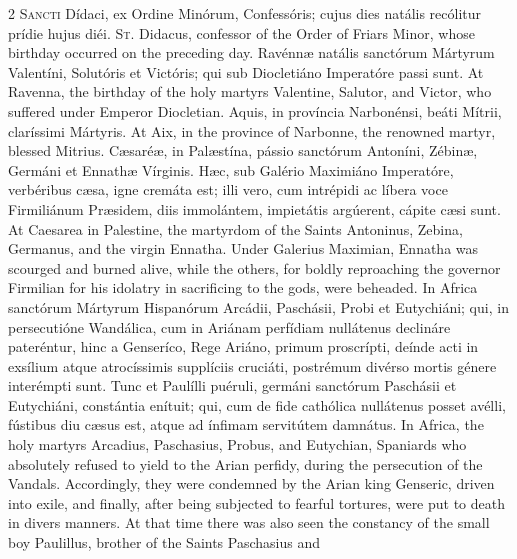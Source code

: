 \begin{paracol}{2}
\lettrine[lines=2]{S}{ancti} Dídaci, ex 
 Ordine Minórum, Confessóris; cujus dies natális recólitur prídie hujus diéi.
\switchcolumn
{}
\lettrine[lines=2]{S}{t.} Didacus, confessor of the Order 
 of Friars Minor, whose birthday occurred on the preceding day.
\switchcolumn*
{}
Ravénnæ natális 
 sanctórum Mártyrum Valentíni, Solutóris et Victóris; qui sub Diocletiáno 
 Imperatóre passi sunt.
\switchcolumn
{}
At Ravenna, the birthday of the holy 
 martyrs Valentine, Salutor, and Victor, who suffered under Emperor 
 Diocletian.
\switchcolumn*
{}
Aquis, in província 
 Narbonénsi, beáti Mítrii, claríssimi Mártyris.
\switchcolumn
{}
At Aix, in the province of Narbonne, 
 the renowned martyr, blessed Mitrius.
\switchcolumn*
{}
Cæsaréæ, in Palæstína, 
 pássio sanctórum Antoníni, Zébinæ, Germáni et Ennathæ Vírginis. Hæc, 
 sub Galério Maximiáno Imperatóre, verbéribus cæsa, igne cremáta est; illi 
 vero, cum intrépidi ac líbera voce Firmiliánum Præsidem, diis immolántem, 
 impietátis argúerent, cápite cæsi sunt.
\switchcolumn
{}
At Caesarea in Palestine, the 
 martyrdom of the Saints Antoninus, Zebina, Germanus, and the virgin Ennatha. 
 Under Galerius Maximian, Ennatha was scourged and burned alive, while the 
 others, for boldly reproaching the governor Firmilian for his idolatry in 
 sacrificing to the gods, were beheaded.
\switchcolumn*
{}
In Africa sanctórum 
 Mártyrum Hispanórum Arcádii, Paschásii, Probi et Eutychiáni; qui, in 
 persecutióne Wandálica, cum in Ariánam perfídiam nullátenus declináre 
 pateréntur, hinc a Genseríco, Rege Ariáno, primum proscrípti, deínde acti in 
 exsílium atque atrocíssimis supplíciis cruciáti, postrémum divérso mortis 
 génere interémpti sunt. Tunc et Paulílli puéruli, germáni sanctórum 
 Paschásii et Eutychiáni, constántia enítuit; qui, cum de fide cathólica 
 nullátenus posset avélli, fústibus diu cæsus est, atque ad ínfimam 
 servitútem damnátus.
\switchcolumn
{}
In Africa, the holy martyrs Arcadius, 
 Paschasius, Probus, and Eutychian, Spaniards who absolutely refused to yield 
 to the Arian perfidy, during the persecution of the Vandals. 
 Accordingly, they were condemned by the Arian king Genseric, driven into exile, and finally, after being subjected to fearful tortures, were put to 
 death in divers manners. At that time there was also seen the 
 constancy of the small boy Paulillus, brother of the Saints Paschasius and 

\end{paracol}
